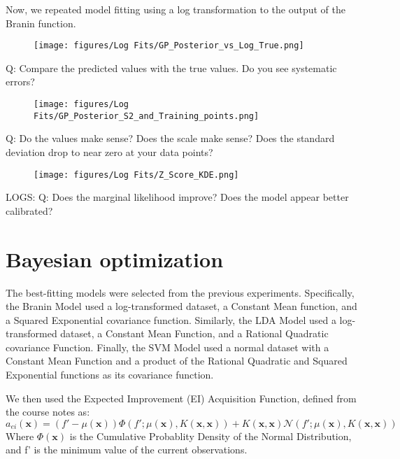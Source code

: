\documentclass[11pt]{article}
\numberwithin{equation}{section}
\begin{document}
Now, we repeated model fitting using a log transformation to the output of the Branin function.
\begin{figure}[H]
  \centering
  \texttt{[image: figures/Log Fits/GP\_Posterior\_vs\_Log\_True.png]}
  \caption{}
  \label{}
\end{figure}
Q: Compare
the predicted values with the true values. Do you see systematic errors?

\begin{figure}[H]
  \centering
  \texttt{[image: figures/Log Fits/GP\_Posterior\_S2\_and\_Training\_points.png]}
  \caption{}
  \label{}
\end{figure}
Q: Do the values make sense? Does the scale make sense? Does the standard
deviation drop to near zero at your data points?

\begin{figure}[H]
  \centering
  \texttt{[image: figures/Log Fits/Z\_Score\_KDE.png]}
  \caption{}
  \label{}
\end{figure}


LOGS:
Q:  Does the
marginal likelihood improve? Does the model appear better calibrated?

\section*{Bayesian optimization}

The best-fitting models were selected from the previous experiments. 
Specifically, the Branin Model used a log-transformed dataset, a Constant Mean function, and a Squared Exponential covariance function.
Similarly, the LDA Model used a log-transformed dataset, a Constant Mean Function, and a Rational Quadratic covariance Function.
Finally, the SVM Model used a normal dataset with a Constant Mean Function and a product of the Rational Quadratic and Squared Exponential functions as its covariance function.

We then used the Expected Improvement (EI) Acquisition Function, defined from the course notes as:
\begin{equation}
  a_{ei}(\bm{x}) = (f' - \mu(\bm{x}))\Phi(f';\mu(\bm{x}),K(\bm{x},\bm{x})) + K(\bm{x},\bm{x})\mathcal{N}(f';\mu(\bm{x}),K(\bm{x},\bm{x}))
  \label{eq:Expected Improvement}
\end{equation}
Where $\Phi(\bm{x})$ is the Cumulative Probablity Density of the Normal Distribution, and f' is the minimum value of the current observations.
\end{document}
